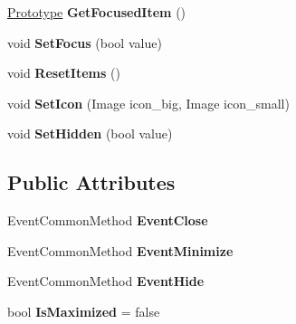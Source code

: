 \begin{DoxyCompactItemize}
\mbox{\hyperlink{class_space_v_i_l_1_1_prototype}{Prototype}} {\bfseries Get\+Focused\+Item} ()
\item 
\mbox{\label{class_space_v_i_l_1_1_window_layout_aba0ff8d24701678623e16a4b9b4d6752}} 
void {\bfseries Set\+Focus} (bool value)
\item 
\mbox{\label{class_space_v_i_l_1_1_window_layout_a3ec42676ba1742952fe7a319316fd8e9}} 
void {\bfseries Reset\+Items} ()
\item 
\mbox{\label{class_space_v_i_l_1_1_window_layout_a72d631b768a1e4d902c87b603848de86}} 
void {\bfseries Set\+Icon} (Image icon\+\_\+big, Image icon\+\_\+small)
\item 
\mbox{\label{class_space_v_i_l_1_1_window_layout_af85271fa0e4bbc270bde2c916165963c}} 
void {\bfseries Set\+Hidden} (bool value)
\end{DoxyCompactItemize}
\subsection*{Public Attributes}
\begin{DoxyCompactItemize}
\item 
\mbox{\label{class_space_v_i_l_1_1_window_layout_a130baa9a43ec2823d2bafb75b1889f82}} 
Event\+Common\+Method {\bfseries Event\+Close}
\item 
\mbox{\label{class_space_v_i_l_1_1_window_layout_ac4db796a7eaccc304ae437e798b99036}} 
Event\+Common\+Method {\bfseries Event\+Minimize}
\item 
\mbox{\label{class_space_v_i_l_1_1_window_layout_ad8c00f35a5b9edaee8493ca8355d7dd2}} 
Event\+Common\+Method {\bfseries Event\+Hide}
\item 
\mbox{\label{class_space_v_i_l_1_1_window_layout_adf5fff8b398ec9489987442f37a93d4e}} 
bool {\bfseries Is\+Maximized} = false
\end{DoxyCompactItemize}
